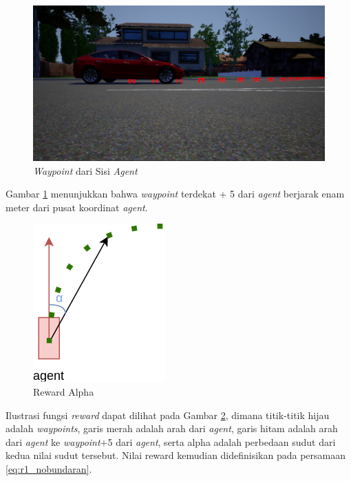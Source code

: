 \begin{figure}[H] 
	\centering
	\includegraphics[width=1\linewidth]{images/waypoint_fromside}
	\caption{\textit{Waypoint }dari Sisi \textit{Agent}}
	\label{fig:waypoint_fromside}
\end{figure}

Gambar \ref{fig:waypoint_fromside} menunjukkan bahwa \textit{waypoint} terdekat + 5 dari \textit{agent} berjarak enam meter dari pusat koordinat \textit{agent}.

\begin{figure}[H] 
	\centering
	\includegraphics[width=.5\linewidth]{images/reward_alpha}
	\caption{Reward Alpha}
	\label{fig:reward_alpha}
\end{figure}

Ilustrasi fungsi \textit{reward} dapat dilihat pada Gambar \ref{fig:reward_alpha}, dimana titik-titik hijau adalah \textit{waypoints}, garis merah adalah arah dari \textit{agent}, garis hitam adalah arah dari \textit{agent} ke \textit{waypoint}+5 dari \textit{agent}, serta alpha adalah perbedaan sudut dari kedua nilai sudut tersebut. Nilai reward kemudian didefinisikan pada persamaan \ref{eq:r1_nobundaran}.

